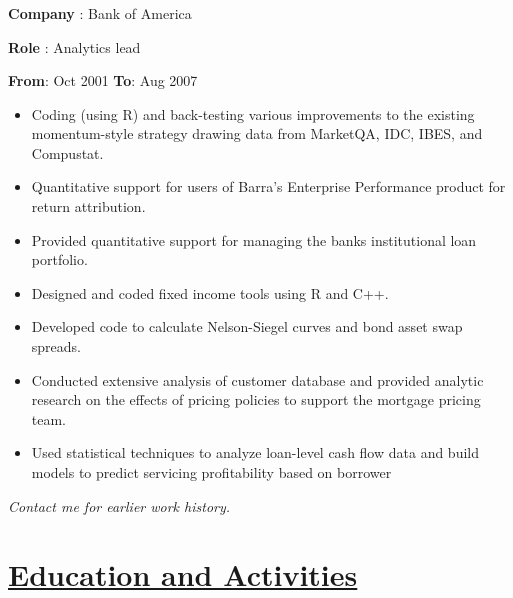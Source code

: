 \documentclass[
]{article}
\providecommand{\tightlist}{%
  \setlength{\itemsep}{0pt}\setlength{\parskip}{0pt}}
\begin{document}

\hypertarget{bofa}{\subsubsection{}\label{bofa}}
\begin{flushleft}
\textbf{Company} : Bank of America
\end{flushleft}

\begin{flushleft}
\textbf{Role} : Analytics lead
\end{flushleft}
\textbf{From}: Oct 2001 \hspace{0.5in}  \textbf{To}: Aug 2007\\

  \begin{itemize}
  \tightlist
  \item
    Coding (using R) and back-testing various improvements to the
    existing momentum-style strategy drawing data from MarketQA, IDC,
    IBES, and Compustat.
  \item
    Quantitative support for users of Barra's Enterprise Performance
    product for return attribution.

  \item  Provided quantitative support for managing the banks institutional loan portfolio.
  \item
    Designed and coded fixed income tools using R and C++.
  \item
    Developed code to calculate Nelson-Siegel curves and bond asset swap
    spreads.

  \item   Conducted extensive analysis of customer database and provided
  analytic research on the effects of pricing policies to support the
  mortgage pricing team. 
  \item Used statistical techniques to analyze
  loan-level cash flow data and build models to predict servicing
  profitability based on borrower
  \end{itemize}

\emph{Contact me for earlier work history.}

\hypertarget{education-and-activities}{
\section{\texorpdfstring{\underline{\textbf{Education and
Activities}}}{Education and Activities}}\label{education-and-activities}}
\end{document}
